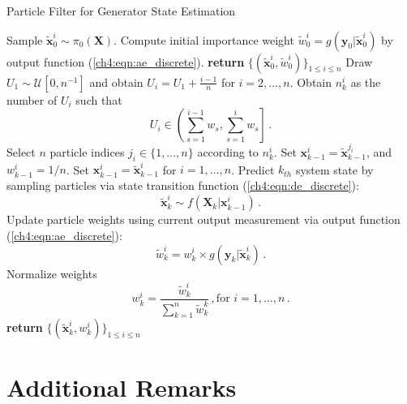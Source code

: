 \begin{algorithm}
\caption{Particle Filter for Generator State Estimation}\label{alg:particle_filter}
\begin{algorithmic}[1]
\State Sample $\tilde{\boldsymbol{x}}_0^{i} \sim \pi_0(\boldsymbol{X})$.
\State Compute initial importance weight
$
\tilde{w}_0^{i} = g(\boldsymbol{y}_0 | \tilde{\boldsymbol{x}}_0^{i})
$ by output function (\ref{ch4:eqn:ae_discrete}).
\EndFor
\State \textbf{return} $\{(\tilde{\boldsymbol{x}}_{0}^{i}, \tilde{w}_{0}^{i})\}_{1\leq i \leq n}$
\EndProcedure
\Statex
{}
 
\State Draw $U_{1} \sim \mathcal{U}\left[0, {n}^{-1}\right]$ and obtain $U_{i}=U_{1}+\frac{i-1}{n}$ for $i=2, \ldots, n$.
\State Obtain $n_k^{i}$ as the number of $U_i$ such that
$$
U_i \in \left(\sum_{s=1}^{i-1} w_{s}, \sum_{s=1}^{i} w_{s}\right] \,.
$$ 
\State Select $n$ particle indices $j_i \in \{1, \dots, n\}$ according to $n_k^{i}$.
\State Set $\boldsymbol{x}_{k-1}^{i} = \tilde{\boldsymbol{x}}_{k-1}^{j_i}$, and $w_{k-1}^{i} = 1/n$.
\EndFor
\Else 
\State Set $\boldsymbol{x}_{k-1}^{i} = \tilde{\boldsymbol{x}}_{k-1}^{i}$ for $i=1, \ldots, n$.
\EndIf
{}
\State Predict $k_{th}$ system state by sampling particles via state transition function (\ref{ch4:eqn:de_discrete}): 
$$
\tilde{\boldsymbol{x}}_k^{i} \sim f(\boldsymbol{X}_k|\boldsymbol{x}_{k-1}^{i}) \,.
$$ 
\State Update particle weights using current output measurement via output function (\ref{ch4:eqn:ae_discrete}): 
$$
\tilde{w}_k^{i} = {w}_k^{i} \times g(\boldsymbol{y}_k | \tilde{\boldsymbol{x}}_k^{i}) \,.
$$
\EndFor
\State Normalize weights
$$
w_k^{i} = \frac{\tilde{w}_k^{i}}{\sum_{k=1}^{n}\tilde{w}_k^{k}} \,, \text{for } i = 1, \dots, n \,.
$$
\State \textbf{return} $\{(\tilde{\boldsymbol{x}}_{k}^{i}, w_{k}^{i})\}_{1\leq i \leq n}$
\EndProcedure
\end{algorithmic}
\end{algorithm}



\section{Additional Remarks} %
\label{ssub:additional_remarks}
